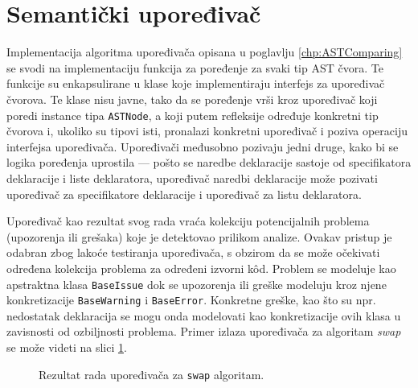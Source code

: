 \section{Semantički upoređivač}
\label{sec:ImplementationComparer}

Implementacija algoritma upoređivača opisana u poglavlju \ref{chp:ASTComparing} se svodi na implementaciju funkcija za poređenje za svaki tip AST čvora. Te funkcije su enkapsulirane u klase koje implementiraju interfejs za upoređivač čvorova. Te klase nisu javne, tako da se poređenje vrši kroz upoređivač koji poredi instance tipa \texttt{ASTNode}, a koji putem refleksije određuje konkretni tip čvorova i, ukoliko su tipovi isti, pronalazi konkretni upoređivač i poziva operaciju interfejsa upoređivača. Upoređivači međusobno pozivaju jedni druge, kako bi se logika poređenja uprostila --- pošto se naredbe deklaracije sastoje od specifikatora deklaracije i liste deklaratora, upoređivač naredbi deklaracije može pozivati upoređivač za specifikatore deklaracije i upoređivač za listu deklaratora. 

Upoređivač kao rezultat svog rada vraća kolekciju potencijalnih problema (upozorenja ili grešaka) koje je detektovao prilikom analize. Ovakav pristup je odabran zbog lakoće testiranja upoređivača, s obzirom da se može očekivati određena kolekcija problema za određeni izvorni k\^od. Problem se modeluje kao apstraktna klasa \texttt{BaseIssue} dok se upozorenja ili greške modeluju kroz njene konkretizacije \texttt{BaseWarning} i \texttt{BaseError}. Konkretne greške, kao što su npr. nedostatak deklaracija se mogu onda modelovati kao konkretizacije ovih klasa u zavisnosti od ozbiljnosti problema. Primer izlaza upoređivača za algoritam \emph{swap} se može videti na slici \ref{fig:ComparerSwap}.

\begin{figure}[h!]
\centering
\caption{Rezultat rada upoređivača za \texttt{swap} algoritam.}
\label{fig:ComparerSwap}
\end{figure}
